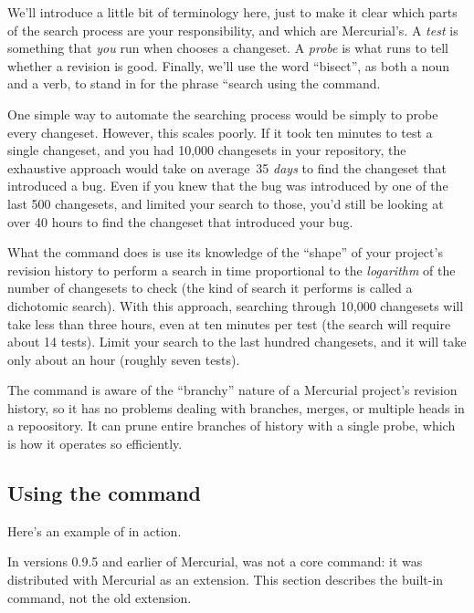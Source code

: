 We'll introduce a little bit of terminology here, just to make it
clear which parts of the search process are your responsibility, and
which are Mercurial's.  A \emph{test} is something that \emph{you} run
when  chooses a changeset.  A \emph{probe} is what
 runs to tell whether a revision is good.  Finally,
we'll use the word ``bisect'', as both a noun and a verb, to stand in
for the phrase ``search using the  command.

One simple way to automate the searching process would be simply to
probe every changeset.  However, this scales poorly.  If it took ten
minutes to test a single changeset, and you had 10,000 changesets in
your repository, the exhaustive approach would take on average~35
\emph{days} to find the changeset that introduced a bug.  Even if you
knew that the bug was introduced by one of the last 500 changesets,
and limited your search to those, you'd still be looking at over 40
hours to find the changeset that introduced your bug.

What the  command does is use its knowledge of the
``shape'' of your project's revision history to perform a search in
time proportional to the \emph{logarithm} of the number of changesets
to check (the kind of search it performs is called a dichotomic
search).  With this approach, searching through 10,000 changesets will
take less than three hours, even at ten minutes per test (the search
will require about 14 tests).  Limit your search to the last hundred
changesets, and it will take only about an hour (roughly seven tests).

The  command is aware of the ``branchy'' nature of a
Mercurial project's revision history, so it has no problems dealing
with branches, merges, or multiple heads in a repoository.  It can
prune entire branches of history with a single probe, which is how it
operates so efficiently.

\subsection{Using the  command}

Here's an example of  in action.

\begin{note}
  In versions 0.9.5 and earlier of Mercurial,  was not a
  core command: it was distributed with Mercurial as an extension.
  This section describes the built-in command, not the old extension.
\end{note}

